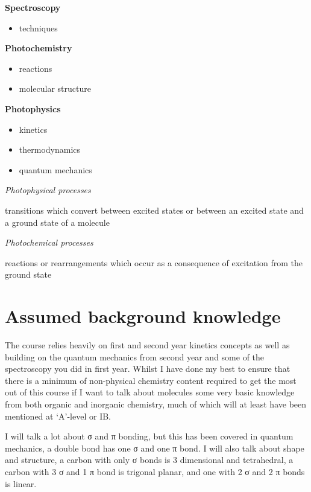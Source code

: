 \documentclass[
]{book}
\providecommand{\tightlist}{%
  \setlength{\itemsep}{0pt}\setlength{\parskip}{0pt}}
\begin{document}
\textbf{Spectroscopy}

\begin{itemize}
\tightlist
\item
  techniques
\end{itemize}

\textbf{Photochemistry}

\begin{itemize}
\tightlist
\item
  reactions
\item
  molecular structure
\end{itemize}

\textbf{Photophysics}

\begin{itemize}
\tightlist
\item
  kinetics
\item
  thermodynamics
\item
  quantum mechanics
\end{itemize}

\emph{Photophysical processes}

transitions which convert between excited states or between an excited state and a ground state of a molecule

\emph{Photochemical processes}

reactions or rearrangements which occur as a consequence of excitation from the ground state

\hypertarget{assumed-background-knowledge}{%
\section{Assumed background knowledge}\label{assumed-background-knowledge}}

The course relies heavily on first and second year kinetics concepts as well as building on the quantum mechanics from second year and some of the spectroscopy you did in first year. Whilst I have done my best to ensure that there is a minimum of non-physical chemistry content required to get the most out of this course if I want to talk about molecules some very basic knowledge from both organic and inorganic chemistry, much of which will at least have been mentioned at `A'-level or IB.

I will talk a lot about σ and π bonding, but this has been covered in quantum mechanics, a double bond has one σ and one π bond. I will also talk about shape and structure, a carbon with only σ bonds is 3 dimensional and tetrahedral, a carbon with 3 σ and 1 π bond is trigonal planar, and one with 2 σ and 2 π bonds is linear.
\end{document}
